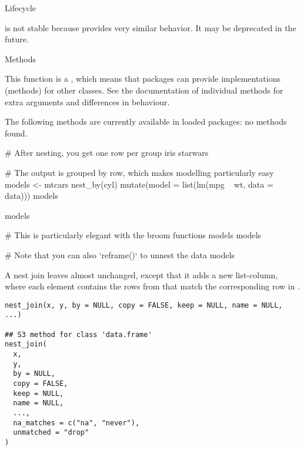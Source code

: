 \documentclass[a4paper]{book}
\begin{document}
%
\begin{Section}{Lifecycle}

 is not stable because 
provides very similar behavior. It may be deprecated in the future.
\end{Section}
%
\begin{Section}{Methods}

This function is a , which means that packages can provide
implementations (methods) for other classes. See the documentation of
individual methods for extra arguments and differences in behaviour.

The following methods are currently available in loaded packages:
no methods found.
\end{Section}
%
\begin{Examples}
\begin{ExampleCode}
# After nesting, you get one row per group
iris %
starwars %

# The output is grouped by row, which makes modelling particularly easy
models <- mtcars %
  nest_by(cyl) %
  mutate(model = list(lm(mpg ~ wt, data = data)))
models

models %


# This is particularly elegant with the broom functions
models %
models %


# Note that you can also `reframe()` to unnest the data
models %
\end{ExampleCode}
\end{Examples}
%
\begin{Description}
A nest join leaves  almost unchanged, except that it adds a new
list-column, where each element contains the rows from  that match the
corresponding row in .
\end{Description}
%
\begin{Usage}
\begin{verbatim}
nest_join(x, y, by = NULL, copy = FALSE, keep = NULL, name = NULL, ...)

## S3 method for class 'data.frame'
nest_join(
  x,
  y,
  by = NULL,
  copy = FALSE,
  keep = NULL,
  name = NULL,
  ...,
  na_matches = c("na", "never"),
  unmatched = "drop"
)
\end{verbatim}
\end{Usage}
\end{document}
